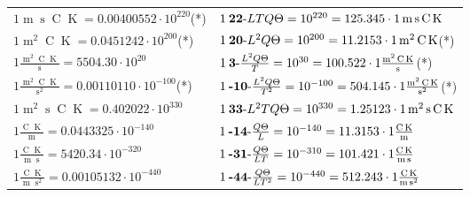 \begin{center}
\begin{longtable}{l l}
{\color{black}$1 \bm{\mathrm{ }}\operatorname{m}\operatorname{s}\operatorname{C}\operatorname{K} = 0.00400552\cdot10^{220} $}\quad(*)&
	{\color{black}$1\:\text{\textbf{22}-} LTQ\Theta=10^{220} = 125.345 \cdot 1 \bm{\mathrm{ }}\operatorname{m}\operatorname{s}\operatorname{C}\operatorname{K}$}\\
{\color{black}$1 \bm{\mathrm{ }}\operatorname{m}^2\operatorname{C}\operatorname{K} = 0.0451242\cdot10^{200} $}\quad(*)&
	{\color{black}$1\:\text{\textbf{20}-} L^2Q\Theta=10^{200} = 11.2153 \cdot 1 \bm{\mathrm{ }}\operatorname{m}^2\operatorname{C}\operatorname{K}$}\quad(*)\\
{\color{black}$1 \bm{\mathrm{ }}\frac{\operatorname{m}^2\operatorname{C}\operatorname{K}}{\operatorname{s}} = 5504.30\cdot10^{20} $}&
	{\color{black}$1\:\text{\textbf{3}-} \frac{L^2Q\Theta}{T}=10^{30} = 100.522 \cdot 1 \bm{\mathrm{ }}\frac{\operatorname{m}^2\operatorname{C}\operatorname{K}}{\operatorname{s}}$}\quad(*)\\
{\color{black}$1 \bm{\mathrm{ }}\frac{\operatorname{m}^2\operatorname{C}\operatorname{K}}{\operatorname{s}^2} = 0.00110110\cdot10^{-100} $}\quad(*)&
	{\color{black}$1\:\text{\textbf{-10}-} \frac{L^2Q\Theta}{T^2}=10^{-100} = 504.145 \cdot 1 \bm{\mathrm{ }}\frac{\operatorname{m}^2\operatorname{C}\operatorname{K}}{\operatorname{s}^2}$}\quad(*)\\
{\color{black}$1 \bm{\mathrm{ }}\operatorname{m}^2\operatorname{s}\operatorname{C}\operatorname{K} = 0.402022\cdot10^{330} $}&
	{\color{black}$1\:\text{\textbf{33}-} L^2TQ\Theta=10^{330} = 1.25123 \cdot 1 \bm{\mathrm{ }}\operatorname{m}^2\operatorname{s}\operatorname{C}\operatorname{K}$}\\
{\color{black}$1 \bm{\mathrm{ }}\frac{\operatorname{C}\operatorname{K}}{\operatorname{m}} = 0.0443325\cdot10^{-140} $}&
	{\color{black}$1\:\text{\textbf{-14}-} \frac{Q\Theta}{L}=10^{-140} = 11.3153 \cdot 1 \bm{\mathrm{ }}\frac{\operatorname{C}\operatorname{K}}{\operatorname{m}}$}\\
{\color{black}$1 \bm{\mathrm{ }}\frac{\operatorname{C}\operatorname{K}}{\operatorname{m}\operatorname{s}} = 5420.34\cdot10^{-320} $}&
	{\color{black}$1\:\text{\textbf{-31}-} \frac{Q\Theta}{LT}=10^{-310} = 101.421 \cdot 1 \bm{\mathrm{ }}\frac{\operatorname{C}\operatorname{K}}{\operatorname{m}\operatorname{s}}$}\\
{\color{black}$1 \bm{\mathrm{ }}\frac{\operatorname{C}\operatorname{K}}{\operatorname{m}\operatorname{s}^2} = 0.00105132\cdot10^{-440} $}&
	{\color{black}$1\:\text{\textbf{-44}-} \frac{Q\Theta}{LT^2}=10^{-440} = 512.243 \cdot 1 \bm{\mathrm{ }}\frac{\operatorname{C}\operatorname{K}}{\operatorname{m}\operatorname{s}^2}$}\\

\end{longtable}
\end{center}
